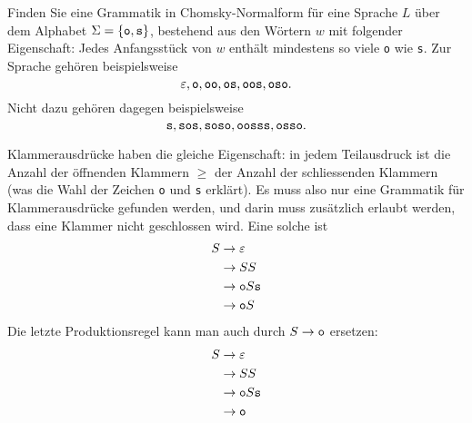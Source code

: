 Finden Sie eine Grammatik in Chomsky-Normalform für eine Sprache
$L$ über dem Alphabet
$\Sigma=\{\text{\tt o},\text{\tt s}\}$, bestehend aus den Wörtern
$w$ mit folgender Eigenschaft: Jedes Anfangsstück von $w$ enthält mindestens
so viele {\tt o} wie {\tt s}. Zur Sprache gehören beispielsweise
\[
\varepsilon,
\text{\tt o},
\text{\tt oo},
\text{\tt os},
\text{\tt oos},
\text{\tt oso}.
\]
Nicht dazu gehören dagegen beispielsweise
\[
\text{\tt s},
\text{\tt sos},
\text{\tt soso},
\text{\tt oosss},
\text{\tt osso}.
\]


\begin{loesung}
Klammerausdrücke haben die gleiche Eigenschaft: in jedem Teilausdruck
ist die Anzahl der öffnenden Klammern $\ge$ der Anzahl der schliessenden
Klammern (was die Wahl der Zeichen {\tt o} und {\tt s} erklärt). Es muss
also nur eine Grammatik für Klammerausdrücke gefunden werden, und darin
muss zusätzlich erlaubt werden, dass eine Klammer nicht geschlossen
wird. Eine solche ist
\begin{align*}
S&\rightarrow \varepsilon\\
 &\rightarrow SS\\
 &\rightarrow {\tt o}S{\tt s}\\
 &\rightarrow {\tt o}S
\end{align*}
Die letzte Produktionsregel kann man auch durch $S\rightarrow{\tt o}$
ersetzen:
\begin{align*}
S&\rightarrow \varepsilon\\
 &\rightarrow SS\\
 &\rightarrow {\tt o}S{\tt s}\\
 &\rightarrow {\tt o}
\end{align*}


\end{loesung}
